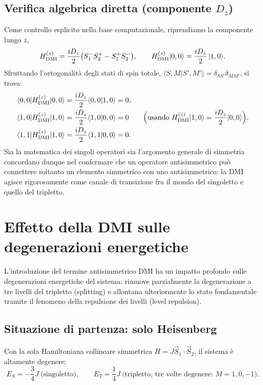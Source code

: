 \documentclass[11pt,a4paper]{article}
\begin{document}
\subsection{Verifica algebrica diretta (componente $D_z$)}

Come controllo esplicito nella base computazionale, riprendiamo la componente lungo
$z$,
$$H_{\rm DMI}^{(z)} = \frac{iD_z}{2}\big(S_1^-S_2^+-S_1^+S_2^-\big), \qquad H_{\rm DMI}^{(z)}|0,0\rangle = \frac{iD_z}{2}\,|1,0\rangle.$$
Sfruttando l'ortogonalit\`a degli stati di spin totale, $\langle S,M|S',M'\rangle=\delta_{SS'}\delta_{MM'}$, si trova:
\begin{align}
\langle0,0|H_{\rm DMI}^{(z)}|0,0\rangle &= \frac{iD_z}{2}\langle0,0|1,0\rangle = 0, \\
\langle1,0|H_{\rm DMI}^{(z)}|1,0\rangle &= \frac{iD_z}{2}\langle1,0|0,0\rangle = 0 \qquad \Big(\text{usando } H_{\rm DMI}^{(z)}|1,0\rangle=\frac{iD_z}{2}|0,0\rangle\Big), \\
\langle1,1|H_{\rm DMI}^{(z)}|1,0\rangle &= \frac{iD_z}{2}\langle1,1|0,0\rangle = 0.
\end{align}
Sia la matematica dei singoli operatori sia l'argomento generale di simmetria
concordano dunque nel confermare che un operatore antisimmetrico pu\`o connettere
soltanto un elemento simmetrico con uno antisimmetrico: la DMI agisce rigorosamente
come canale di transizione fra il mondo del singoletto e quello del tripletto.

\section{Effetto della DMI sulle degenerazioni energetiche}

L'introduzione del termine antisimmetrico DMI ha un impatto profondo sulle
degenerazioni energetiche del sistema: rimuove parzialmente la degenerazione a tre
livelli del tripletto (splitting) e allontana ulteriormente lo stato fondamentale
tramite il fenomeno della repulsione dei livelli (level repulsion).

\subsection{Situazione di partenza: solo Heisenberg}

Con la sola Hamiltoniana collineare simmetrica $H=J\vec S_1\cdot\vec S_2$, il sistema
\`e altamente degenere:
$$E_S = -\frac34 J \ \text{(singoletto)}, \qquad E_T = \frac14 J \ \text{(tripletto, tre volte degenere: } M=1,0,-1\text{)}.$$
\end{document}
